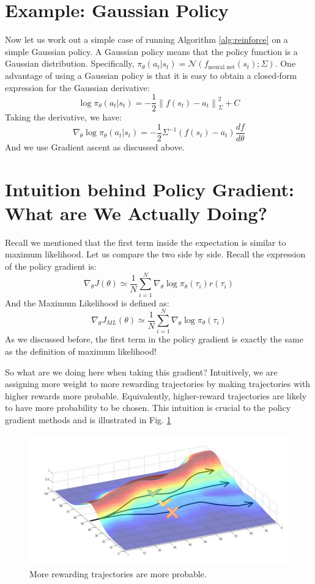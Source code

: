 \section{Example: Gaussian Policy}
Now let us work out a simple case of running Algorithm \ref{alg:reinforce} on a simple Gaussian policy. A Gaussian policy means that the policy function is a Gaussian distribution. Specifically, $\pi_\theta(a_t|s_t) = \mathcal{N}\left(f_\text{neural net}(s_t); \Sigma\right)$. One advantage of using a Gaussian policy is that it is easy to obtain a closed-form expression for the Gaussian derivative:
$$\log \pi_\theta(a_t|s_t) = -\frac{1}{2}{\left\lVert f(s_t)-a_t\right\rVert}_\Sigma^2 + C$$
Taking the derivative, we have:
$$\nabla_\theta \log \pi_\theta(a_t|s_t) = -\frac{1}{2}\Sigma^{-1}(f(s_t)-a_t)\frac{df}{d\theta}$$
And we use Gradient ascent as discussed above.
\section{Intuition behind Policy Gradient: What are We Actually Doing?}
Recall we mentioned that the first term inside the expectation is similar to maximum likelihood. Let us compare the two side by side. Recall the expression of the policy gradient is:
$$\nabla_\theta J(\theta) \simeq \frac{1}{N}\sum_{i=1}^N\nabla_\theta \log \pi_\theta(\tau_i)r(\tau_i)$$
And the Maximum Likelihood is defined as:
$$\nabla_\theta J_{ML}(\theta)\simeq\frac{1}{N}\sum_{i=1}^N\nabla_\theta \log \pi_\theta(\tau_i)$$
As we discussed before, the first term in the policy gradient is exactly the same as the definition of maximum likelihood!

So what are we doing here when taking this gradient? Intuitively, we are assigning more weight to more rewarding trajectories by making trajectories with higher rewards more probable. Equivalently, higher-reward trajectories are likely to have more probability to be chosen. This intuition is crucial to the policy gradient methods and is illustrated in Fig. \ref{fig:trajheat}
\begin{figure}
    \centering
    \includegraphics[scale=0.5]{figures/trajheat.png}
    \caption{More rewarding trajectories are more probable.}
    \label{fig:trajheat}
\end{figure}

